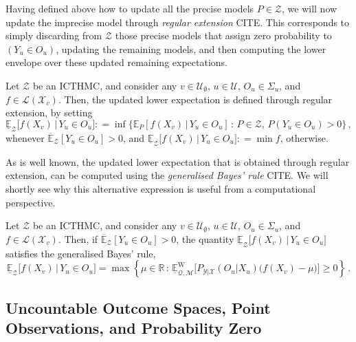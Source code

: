 \documentclass[twoside,11pt]{article}
\newcommand{\reals}{\mathbb{R}}
\newcommand{\states}{\mathcal{X}}
\newcommand{\observs}{\mathcal{Y}}
\newcommand{\lexp}{\underline{\mathbb{E}}_{\rateset,\mathcal{M}}^\mathrm{W}}
\newcommand{\gambles}{\mathcal{L}}
\newcommand{\rateset}{\mathcal{Q}}
\newcommand{\coloneqq}{:\!=}
\begin{document}
Having defined above how to update all the precise models $P\in\mathcal{Z}$, we will now update the imprecise model through \emph{regular extension} CITE. This corresponds to simply discarding from $\mathcal{Z}$ those precise models that assign zero probability to $(Y_u\in O_u)$, updating the remaining models, and then computing the lower envelope over these updated remaining expectations.

\begin{definition}
Let $\mathcal{Z}$ be an ICTHMC, and consider any $v\in\mathcal{U}_\emptyset$, $u\in\mathcal{U}$, $O_u\in\Sigma_u$, and $f\in\gambles(\states_v)$. Then, the updated lower expectation is defined through regular extension, by setting
\begin{equation*}
\underline{\mathbb{E}}_{\mathcal{Z}}\bigl[f(X_v)\,\vert\,Y_u\in O_u\bigr] \coloneqq \inf\bigl\{ \mathbb{E}_P[f(X_v)\,\vert\,Y_u\in O_u]\,:\, P\in\mathcal{Z},\, P(Y_u\in O_u)>0 \bigr\}\,,
\end{equation*}
whenever $\overline{\mathbb{E}}_\mathcal{Z}[Y_u\in O_u] >0$, and $\underline{\mathbb{E}}_{\mathcal{Z}}\bigl[f(X_v)\,\vert\,Y_u\in O_u\bigr]\coloneqq\min f$, otherwise.
\end{definition}

As is well known, the updated lower expectation that is obtained through regular extension, can be computed using the \emph{generalised Bayes' rule} CITE. We will shortly see why this alternative expression is useful from a computational perspective.
\begin{proposition}\label{prop:GBR_regular}
Let $\mathcal{Z}$ be an ICTHMC, and consider any $v\in\mathcal{U}_\emptyset$, $u\in\mathcal{U}$, $O_u\in\Sigma_u$, and $f\in\gambles(\states_v)$. Then, if $\overline{\mathbb{E}}_\mathcal{Z}[Y_u\in O_u] > 0$, the quantity $\underline{\mathbb{E}}_{\mathcal{Z}}\bigl[f(X_v)\,\vert\,Y_u\in O_u\bigr]$ satisfies the generalised Bayes' rule,
\begin{equation*}
\underline{\mathbb{E}}_{\mathcal{Z}}\bigl[f(X_v)\,\vert\,Y_u\in O_u\bigr] = \max\left\{\mu\in\reals\,:\, \lexp\bigl[P_{\observs\vert\states}(O_u\vert X_u)\bigl(f(X_v) - \mu\bigr)\bigr] \geq 0\right\}\,.
\end{equation*}
\end{proposition}

\subsection{Uncountable Outcome Spaces, Point Observations, and Probability Zero}\label{subsec:uncountable}
\end{document}
